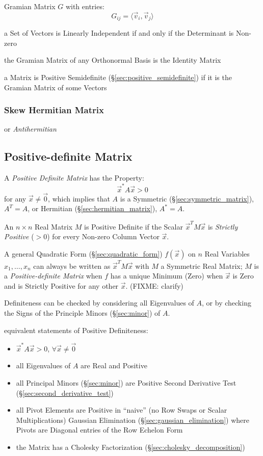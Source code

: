 Gramian Matrix $G$ with entries:
\[
  G_{ij} = \langle{\vec{v}_i,\vec{v}_j}\rangle
\]

a Set of Vectors is Linearly Independent if and only if the Determinant is
Non-zero

the Gramian Matrix of any Orthonormal Basis is the Identity Matrix

a Matrix is Positive Semidefinite (\S\ref{sec:positive_semidefinite}) if it is
the Gramian Matrix of some Vectors



\subsubsection{Skew Hermitian Matrix}\label{sec:skew_hermitian}

or \emph{Antihermitian}



\subsection{Positive-definite Matrix}\label{sec:positive_definite}

A \emph{Positive Definite Matrix} has the Property:
\[
  \vec{x}^* A \vec{x} > 0
\]
for any $\vec{x} \neq \vec{0}$, which implies that $A$ is a Symmetric
(\S\ref{sec:symmetric_matrix}), $A^T = A$, or Hermitian
(\S\ref{sec:hermitian_matrix}), $A^* = A$.

An $n \times n$ Real Matrix $M$ is Positive Definite if the Scalar
$\vec{x}^TM\vec{x}$ is \emph{Strictly Positive} ($>0$) for every Non-zero
Column Vector $\vec{x}$.

A general Quadratic Form (\S\ref{sec:quadratic_form}) $f(\vec{x})$ on $n$ Real
Variables $x_1,\ldots,x_n$ can always be written as $\vec{x}^T M \vec{x}$ with
$M$ a Symmetric Real Matrix; $M$ is a \emph{Positive-definite Matrix} when $f$
has a unique Minimum (Zero) when $\vec{x}$ is Zero and is Strictly Positive for
any other $\vec{x}$. (FIXME: clarify)

Definiteness can be checked by considering all Eigenvalues of $A$, or by
checking the Signs of the Principle Minors (\S\ref{sec:minor}) of $A$.

equivalent statements of Positive Definiteness:
\begin{itemize}
  \item $\vec{x}^*A\vec{x} > 0$, $\forall \vec{x} \neq \vec{0}$
  \item all Eigenvalues of $A$ are Real and Positive
  \item all Principal Minors (\S\ref{sec:minor}) are Positive \fist Second
    Derivative Test (\S\ref{sec:second_derivative_test})
  \item all Pivot Elements are Positive in ``naive'' (no Row Swaps or Scalar
    Multiplications) Gaussian Elimination (\S\ref{sec:gaussian_elimination})
    where Pivots are Diagonal entries of the Row Echelon Form
  \item the Matrix has a Cholesky Factorization
    (\S\ref{sec:cholesky_decomposition})
\end{itemize}

